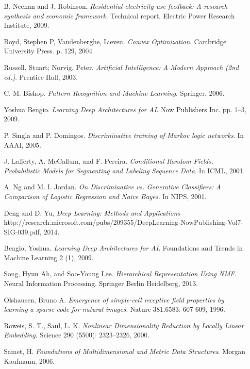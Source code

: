 \begin{thebibliography}{9}
B. Neenan and J. Robinson. \emph{Residential electricity use feedback: A research synthesis and economic framework}. 
Technical report, Electric Power Research Institute, 2009.

Boyd, Stephen P, Vandenberghe, Lieven. \emph{Convex Optimization}. 
Cambridge University Press. p. 129, 2004

Russell, Stuart; Norvig, Peter. \emph{Artificial Intelligence: A Modern Approach (2nd ed.)}. 
Prentice Hall, 2003.

C. M. Bishop. \emph{Pattern Recognition and Machine Learning}. 
Springer, 2006.

Yoshua Bengio. \emph{Learning Deep Architectures for AI}. 
Now Publishers Inc. pp. 1–3, 2009.

P. Singla and P. Domingos. \emph{Discriminative training of Markov logic networks}. 
In AAAI, 2005.

J. Lafferty, A. McCallum, and F. Pereira. \emph{Conditional Random Fields: Probabilistic Models for Segmenting and Labeling Sequence Data}. 
In ICML, 2001.

A. Ng and M. I. Jordan. \emph{On Discriminative vs. Generative Classifiers: A Comparison of Logistic Regression and Naive Bayes}. 
In NIPS, 2001.

Deng and D. Yu, \emph{Deep Learning: Methods and Applications} http://research.microsoft.com/pubs/209355/DeepLearning-NowPublishing-Vol7-SIG-039.pdf, 2014.

Bengio, Yoshua. \emph{Learning Deep Architectures for AI}. Foundations and Trends in Machine Learning 2 (1), 2009.

Song, Hyun Ah, and Soo-Young Lee. \emph{Hierarchical Representation Using NMF}. Neural Information Processing. Springer Berlin Heidelberg, 2013.

Olshausen, Bruno A. \emph{Emergence of simple-cell receptive field properties by learning a sparse code for natural images.} Nature 381.6583: 607-609, 1996.

Roweis, S. T., Saul, L. K. \emph{Nonlinear Dimensionality Reduction by Locally Linear Embedding}. Science 290 (5500): 2323–2326, 2000.

Samet, H.  \emph{Foundations of Multidimensional and Metric Data Structures}. Morgan Kaufmann, 2006.


\end{thebibliography}
